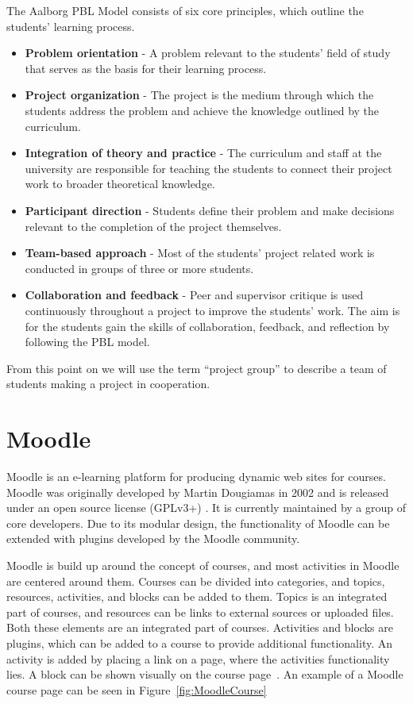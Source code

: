 The Aalborg PBL Model consists of six core principles, which outline the students' learning process.
\begin{itemize}
	\item \textbf{Problem orientation} - A problem relevant to the students' field of study that serves as the basis for their learning process.
	\item \textbf{Project organization} - The project is the medium through which the students address the problem and achieve the knowledge outlined by the curriculum.
	\item \textbf{Integration of theory and practice} - The curriculum and staff at the university are responsible for teaching the students to connect their project work to broader theoretical knowledge.
	\item \textbf{Participant direction} - Students define their problem and make decisions relevant to the completion of the project themselves.
	\item \textbf{Team-based approach} - Most of the students' project related work is conducted in groups of three or more students.
	\item \textbf{Collaboration and feedback} - Peer and supervisor critique is used continuously throughout a project to improve the students' work.
	The aim is for the students gain the skills of collaboration, feedback, and reflection by following the PBL model. 
\end{itemize}

From this point on we will use the term ``project group'' to describe a team of students making a project in cooperation.


\section{Moodle}
\label{sec:Moodle}
Moodle is an e-learning platform for producing dynamic web sites for courses. 
Moodle was originally developed by Martin Dougiamas in 2002 and is released under an open source license (GPLv3+) \citep{gpl}. 
It is currently maintained by a group of core developers. 
Due to its modular design, the functionality of Moodle can be extended with plugins developed by the Moodle community.

Moodle is build up around the concept of courses, and most activities in Moodle are centered around them. 
Courses can be divided into categories, and topics, resources, activities, and blocks can be added to them. 
Topics is an integrated part of courses, and resources can be links to external sources or uploaded files. 
Both these elements are an integrated part of courses. 
Activities and blocks are plugins, which can be added to a course to provide additional functionality. 
An activity is added by placing a link on a page, where the activities functionality lies. 
A block can be shown visually on the course page~\citep{moodleStructural}.
An example of a Moodle course page can be seen in Figure~\ref{fig:MoodleCourse}

